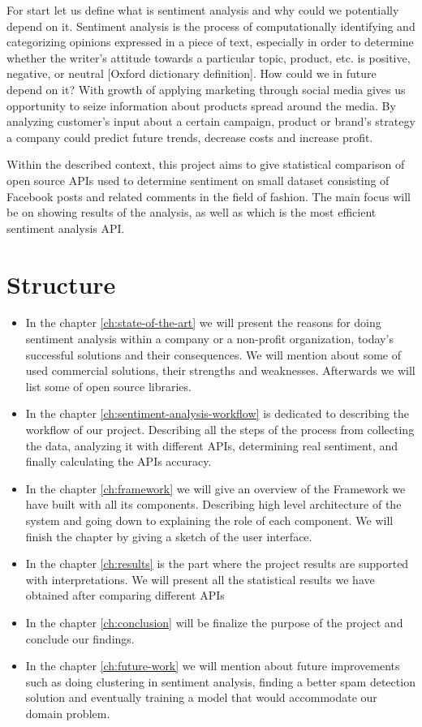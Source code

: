 	For start let us define what is sentiment analysis and why could we potentially depend on it. Sentiment analysis is the process of computationally identifying and categorizing opinions expressed in a piece of text, especially in order to determine whether the writer's attitude towards a particular topic, product, etc. is positive, negative, or neutral [Oxford dictionary definition]. How could we in future depend on it? With growth of applying marketing through social media gives us opportunity to seize information about products spread around the media. By analyzing customer's input about a certain campaign, product or brand's strategy a company could predict future trends, decrease costs and increase profit.
	
	Within the described context, this project aims to give statistical comparison of open source APIs used to determine sentiment on small dataset consisting of Facebook posts and related comments in the field of fashion. The main focus will be on showing results of the analysis, as well as which is the most efficient sentiment analysis API.

\section{Structure}

\begin{itemize}
	\item 
	In the chapter \ref{ch:state-of-the-art}  we will present the reasons for doing sentiment analysis within a company or a non-profit organization, today's successful solutions and their consequences. We will mention about some of used commercial solutions, their strengths and weaknesses. Afterwards we will list some of open source libraries.
	\item 
	In the chapter \ref{ch:sentiment-analysis-workflow} is dedicated to describing the workflow of our project. Describing all the steps of the process from collecting the data, analyzing it with different APIs, determining real sentiment, and finally calculating the APIs accuracy.
	\item 
	In the chapter \ref{ch:framework} we will give an overview of the Framework we have built with all its components. Describing high level architecture of the system and going down to explaining the role of each component. We will finish the chapter by giving a sketch of the user interface.
	\item 
	In the chapter \ref{ch:results} is the part where the project results are supported with interpretations. We will present all the statistical results we have obtained after comparing different APIs
	\item 
	In the chapter \ref{ch:conclusion} will be finalize the purpose of the project and conclude our findings.
	\item 
	In the chapter \ref{ch:future-work} we will mention about future improvements such as doing clustering in sentiment analysis, finding a better spam detection solution and eventually training a model that would accommodate our domain problem.

\end{itemize}
